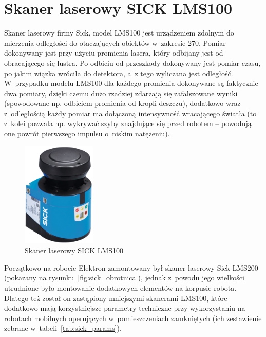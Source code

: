 
\section{Skaner laserowy SICK LMS100}

Skaner laserowy firmy Sick, model LMS100 jest urządzeniem zdolnym do mierzenia
odległości do otaczających obiektów w~zakresie 270\textdegree. Pomiar dokonywany
jest przy użyciu promienia lasera, który odbijany jest od obracającego się
lustra. Po odbiciu od przeszkody dokonywany jest pomiar czasu, po jakim wiązka
wróciła do detektora, a~z tego wyliczana jest odległość. W~przypadku modelu
LMS100 dla każdego promienia dokonywane są faktycznie dwa pomiary, dzięki czemu
dużo rzadziej zdarzają się zafałszowane wyniki (spowodowane np. odbiciem
promienia od kropli deszczu), dodatkowo wraz z~odległością każdy pomiar ma
dołączoną intensywność wracającego światła (to z~kolei pozwala np. wykrywać
szyby znajdujące się przed robotem -- powodują one powrót pierwszego impulsu
o~niskim natężeniu).

\begin{figure}[h!]
\centering
\includegraphics[height=5cm]{../img/LMS100}
\caption{Skaner laserowy SICK LMS100}
\label{fig:sick}
\end{figure}

Początkowo na robocie Elektron zamontowany był skaner laserowy Sick LMS200
(pokazany na rysunku~\ref{fig:sick_obrotnica}), jednak z~powodu jego wielkości
utrudnione było montowanie dodatkowych elementów na korpusie robota. Dlatego też
został on zastąpiony mniejszymi skanerami LMS100, które dodatkowo mają
korzystniejsze parametry techniczne przy wykorzystaniu na robotach mobilnych
operujących w~pomieszczeniach zamkniętych (ich zestawienie zebrane
w~tabeli~\ref{tab:sick_params}).

